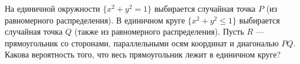 \documentclass{article}
\begin{document}
На единичной окружности $\{x^2+y^2=1\}$ выбирается случайная точка $P$ (из равномерного распределения). В единичном круге 
$\{x^2 + y^2 \leqslant 1\}$ выбирается случайная точка $Q$ (также из равномерного распределения). Пусть $R$ --- прямоугольник со сторонами, параллельными осям координат и диагональю $PQ$. 
Какова вероятность того, что весь прямоугольник лежит в единичном круге?
\end{document}

